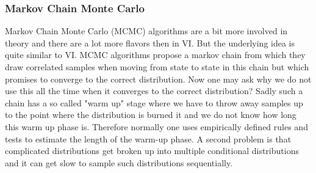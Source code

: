 \documentclass[10pt,conference,compsocconf]{IEEEtran}
\begin{document}
\subsubsection{Markov Chain Monte Carlo}
Markov Chain Monte Carlo (MCMC) algorithms are a bit more involved in theory and there are a lot more flavors then in VI. But the underlying idea is quite similar to VI. MCMC algorithms propose a markov chain from which they draw correlated samples when moving from state to state in this chain but which promises to converge to the correct distribution. Now one may ask why we do not use this all the time when it converges to the correct distribution? Sadly such a chain has a so called "warm up" stage where we have to throw away samples up to the point where the distribution is burned it and we do not know how long this warm up phase is. Therefore normally one uses empirically defined rules and tests to estimate the length of the warm-up phase. A second problem is that complicated distributions get broken up into multiple conditional distributions and it can get slow to sample such distributions sequentially. \\
\end{document}
